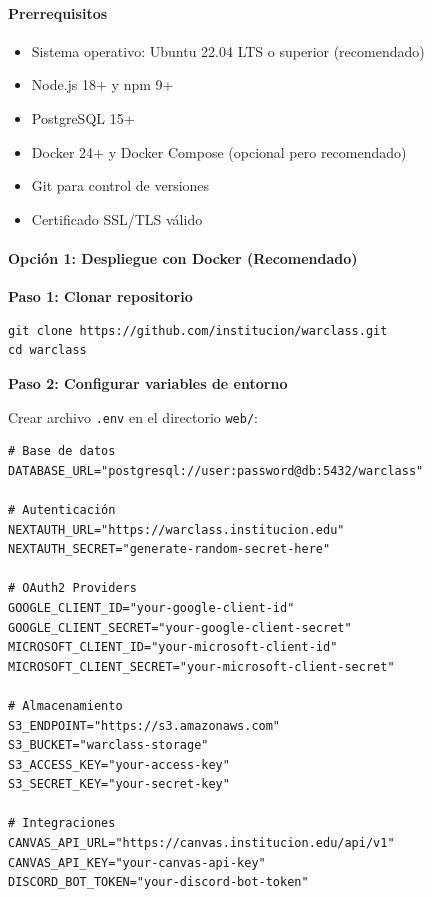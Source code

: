 \paragraph{Prerrequisitos}

\begin{itemize}
	\item Sistema operativo: Ubuntu 22.04 LTS o superior (recomendado)
	\item Node.js 18+ y npm 9+
	\item PostgreSQL 15+
	\item Docker 24+ y Docker Compose (opcional pero recomendado)
	\item Git para control de versiones
	\item Certificado SSL/TLS válido
\end{itemize}

\paragraph{Opción 1: Despliegue con Docker (Recomendado)}

\textbf{Paso 1: Clonar repositorio}

\begin{verbatim}
git clone https://github.com/institucion/warclass.git
cd warclass
\end{verbatim}

\textbf{Paso 2: Configurar variables de entorno}

Crear archivo \texttt{.env} en el directorio \texttt{web/}:

\begin{verbatim}
# Base de datos
DATABASE_URL="postgresql://user:password@db:5432/warclass"

# Autenticación
NEXTAUTH_URL="https://warclass.institucion.edu"
NEXTAUTH_SECRET="generate-random-secret-here"

# OAuth2 Providers
GOOGLE_CLIENT_ID="your-google-client-id"
GOOGLE_CLIENT_SECRET="your-google-client-secret"
MICROSOFT_CLIENT_ID="your-microsoft-client-id"
MICROSOFT_CLIENT_SECRET="your-microsoft-client-secret"

# Almacenamiento
S3_ENDPOINT="https://s3.amazonaws.com"
S3_BUCKET="warclass-storage"
S3_ACCESS_KEY="your-access-key"
S3_SECRET_KEY="your-secret-key"

# Integraciones
CANVAS_API_URL="https://canvas.institucion.edu/api/v1"
CANVAS_API_KEY="your-canvas-api-key"
DISCORD_BOT_TOKEN="your-discord-bot-token"
\end{verbatim}

